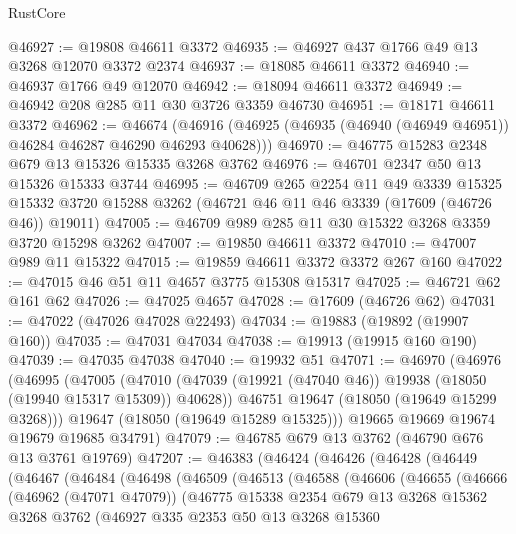 \begin{lexlean}{RustCore}
\begin{coremodule}
@46927 := @19808 @46611 @3372
@46935 := @46927 @437 @1766 @49 @13 @3268 @12070 @3372 @2374
@46937 := @18085 @46611 @3372
@46940 := @46937 @1766 @49 @12070
@46942 := @18094 @46611 @3372
@46949 := @46942 @208 @285 @11 @30 @3726 @3359 @46730
@46951 := @18171 @46611 @3372
@46962 := @46674
    (@46916 (@46925 (@46935 (@46940 (@46949 @46951)) @46284 @46287 @46290 @46293 @40628)))
@46970 := @46775 @15283 @2348 @679 @13 @15326 @15335 @3268 @3762
@46976 := @46701 @2347 @50 @13 @15326 @15333 @3744
@46995 := @46709
    @265
    @2254
    @11
    @49
    @3339
    @15325
    @15332
    @3720
    @15288
    @3262
    (@46721 @46 @11 @46 @3339 (@17609 (@46726 @46)) @19011)
@47005 := @46709 @989 @285 @11 @30 @15322 @3268 @3359 @3720 @15298 @3262
@47007 := @19850 @46611 @3372
@47010 := @47007 @989 @11 @15322
@47015 := @19859 @46611 @3372 @3372 @267 @160
@47022 := @47015 @46 @51 @11 @4657 @3775 @15308 @15317
@47025 := @46721 @62 @161 @62
@47026 := @47025 @4657
@47028 := @17609 (@46726 @62)
@47031 := @47022 (@47026 @47028 @22493)
@47034 := @19883 (@19892 (@19907 @160))
@47035 := @47031 @47034
@47038 := @19913 (@19915 @160 @190)
@47039 := @47035 @47038
@47040 := @19932 @51
@47071 := @46970
    (@46976
      (@46995
        (@47005
          (@47010 (@47039 (@19921 (@47040 @46)) @19938 (@18050 (@19940 @15317 @15309)) @40628))
          @46751
          @19647
          (@18050 (@19649 @15299 @3268)))
        @19647
        (@18050 (@19649 @15289 @15325)))
      @19665
      @19669
      @19674
      @19679
      @19685
      @34791)
@47079 := @46785 @679 @13 @3762 (@46790 @676 @13 @3761 @19769)
@47207 := @46383
    (@46424
      (@46426
        (@46428
          (@46449
            (@46467
              (@46484
                (@46498
                  (@46509
                    (@46513
                      (@46588
                        (@46606
                          (@46655
                            (@46666
                              (@46962 (@47071 @47079))
                              (@46775
                                @15338
                                @2354
                                @679
                                @13
                                @3268
                                @15362
                                @3268
                                @3762
                                (@46927
                                  @335
                                  @2353
                                  @50
                                  @13
                                  @3268
                                  @15360

\end{coremodule}
\end{lexlean}
